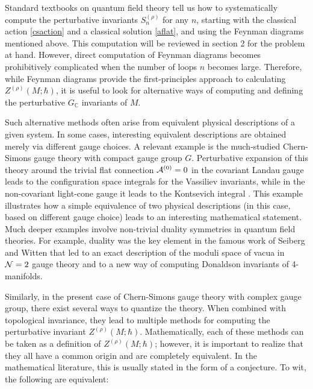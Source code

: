 \documentclass[hyper]{JHEP3}
\def\CA {{\cal A}}
\def\CN {{\cal N}}
\newcommand{\C}{{\mathbb{C}}}
\begin{document}
Standard textbooks on quantum field theory tell us how
to systematically compute the perturbative invariants $S_{n}^{(\rho)}$
for any $n$, starting with the classical action \eqref{csaction}
and a classical solution \eqref{aflat}, and using the Feynman diagrams mentioned above.
This computation will be reviewed in section 2 for the problem at hand.
However, direct computation of Feynman diagrams becomes prohibitively complicated
when the number of loops $n$ becomes large.
Therefore, while Feynman diagrams provide the first-principles approach
to calculating $Z^{(\rho)} (M;\hbar)$, it is useful to look for alternative
ways of computing and defining the perturbative $G_{\C}$ invariants of $M$.

Such alternative methods often arise from equivalent physical descriptions of a given system.
In some cases, interesting equivalent descriptions are obtained merely via different gauge choices.
A relevant example is the much-studied Chern-Simons gauge theory
with compact gauge group $G$.
Perturbative expansion of this theory around the trivial flat connection $\CA^{(0)} = 0$
in the covariant Landau gauge leads to the configuration space integrals
for the Vassiliev invariants, while in the non-covariant light-cone gauge
it leads to the Kontsevich integral \cite{labastida-1999}.
This example illustrates how a simple equivalence of two physical descriptions
(in this case, based on different gauge choice) leads to an interesting mathematical statement.
Much deeper examples involve non-trivial duality symmetries in quantum field theories.
For example,
duality was the key element in the famous work of Seiberg and Witten \cite{sw-1994}
that led to an exact description of the moduli space of vacua in $\CN=2$ gauge theory
and to a new way of computing Donaldson invariants of 4-manifolds.

Similarly, in the present case of Chern-Simons gauge theory with complex gauge group,
there exist several ways to quantize the theory. When combined with topological
invariance, they lead to multiple methods for computing the perturbative invariant $Z^{(\rho)} (M;\hbar)$.
Mathematically, each of these methods can be taken as a definition of $Z^{(\rho)} (M;\hbar)$;
however, it is important to realize that they all have a common origin and
are completely equivalent.
In the mathematical literature, this is usually stated in the form of a conjecture.
To wit, the following are equivalent:
\end{document}
